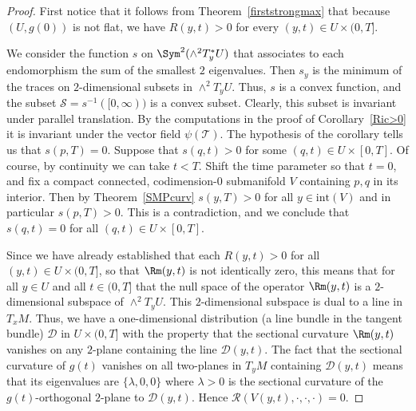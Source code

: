 \begin{proof}
First notice that it follows from Theorem~\ref{firststrongmax} that
because $(U,g(0))$ is not flat, we have $R(y,t)>0$ for every
$(y,t)\in U\times (0,T]$.

 We consider the function $s$ on
$\Sym^2(\wedge^2T^*_yU)$ that associates to each endomorphism
the sum of the smallest $2$ eigenvalues. Then $s_y$ is the minimum
of the traces on $2$-dimensional subsets  in $\wedge^2T_yU$. Thus,
$s$ is a convex function, and the subset ${\mathcal
S}=s^{-1}([0,\infty))$ is a convex subset. Clearly, this subset is
invariant under parallel translation. By the computations in the
proof of Corollary~\ref{Ric>0} it is invariant under the vector
field $\psi({\mathcal T})$. The hypothesis of the corollary tells us
that $s(p,T)=0$. Suppose that $s(q,t)>0$ for some $(q,t)\in U\times
[0,T]$. Of course, by continuity we can take $t< T$. Shift the time
parameter so that $t=0$, and fix a compact connected,
codimension-$0$ submanifold $V$ containing $p,q$ in its interior.
Then by Theorem~\ref{SMPcurv} $s(y,T)>0$ for all $y\in \mathrm{int}(V)$
and in particular $s(p,T)>0$. This is a contradiction, and we
conclude that $s(q,t)=0$ for all $(q,t)\in U\times [0,T]$.

Since we have already established that each $R(y,t)>0$ for all $(y,t)\in
U\times (0,T]$, so that $\Rm(y,t)$ is not identically zero, this means
that for all $y\in U$ and all $t\in (0,T]$ that the null space of the  operator
$\Rm(y,t)$ is a $2$-dimensional subspace of $\wedge^2T_yU$. This
$2$-dimensional subspace is dual to a line in $T_xM$. Thus, we have a
one-dimensional distribution (a line bundle in the tangent bundle) ${\mathcal
D}$ in $U\times (0,T]$ with the property that the sectional curvature $\Rm(y,t)$ vanishes on any $2$-plane containing the line ${\mathcal D}(y,t)$.
The fact that the sectional curvature of $g(t)$ vanishes on all two-planes in
$T_yM$ containing ${\mathcal D}(y,t)$ means that its eigenvalues are
$\{\lambda,0,0\}$ where $\lambda>0$ is the sectional curvature of the
$g(t)$-orthogonal $2$-plane to ${\mathcal D}(y,t)$. Hence ${\mathcal
R}(V(y,t),\cdot,\cdot,\cdot)=0$.


\end{proof}
